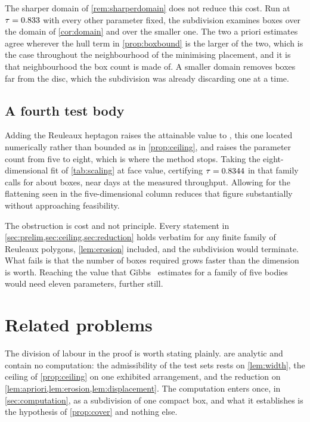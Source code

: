 \documentclass[a4paper,UKenglish,cleveref,autoref,thm-restate,numberwithinsect]{lipics-v2021}
\begin{document}
\begin{remark}
\label{rem:nosaving}
The sharper domain of \cref{rem:sharperdomain} does not reduce this cost. Run at
$\tau=0.833$ with every other parameter fixed, the subdivision examines
\BoxesCheapTarget{} boxes over the domain of \cref{cor:domain} and
\BoxesSharpDomain{} over the smaller one. The two a priori estimates agree
wherever the hull term in \cref{prop:boxbound} is the larger of the two, which is
the case throughout the neighbourhood of the minimising placement, and it is that
neighbourhood the box count is made of. A smaller domain removes boxes far from
the disc, which the subdivision was already discarding one at a time.
\end{remark}

\subsection{A fourth test body}

Adding the Reuleaux heptagon raises the attainable value to \EightDOptimum{},
this one located numerically rather than bounded as in \cref{prop:ceiling}, and
raises the parameter count from five to eight, which is where the method stops. Taking the
eight-dimensional fit of \cref{tab:scaling} at face value, certifying
$\tau=0.8344$ in that family calls for about \EightDBoxes{} boxes, near
\EightDDays{} days at the measured throughput. Allowing for the flattening seen
in the five-dimensional column reduces that figure substantially without
approaching feasibility.

The obstruction is cost and not principle. Every statement in
\cref{sec:prelim,sec:ceiling,sec:reduction} holds verbatim for any finite family
of Reuleaux polygons, \cref{lem:erosion} included, and the subdivision would
terminate. What fails is that the number of boxes required grows faster than the
dimension is worth. Reaching the value that Gibbs~\cite{Gibbs2014} estimates for
a family of five bodies would need eleven parameters, further still.

\section{Related problems}
\label{sec:related}

The division of labour in the proof is worth stating plainly.
 are analytic and contain no
computation: the admissibility of the test sets rests on \cref{lem:width}, the
ceiling of \cref{prop:ceiling} on one exhibited arrangement, and the reduction on
\cref{lem:apriori,lem:erosion,lem:displacement}. The computation enters once, in
\cref{sec:computation}, as a subdivision of one compact box, and what it
establishes is the hypothesis of \cref{prop:cover} and nothing else.
\end{document}
